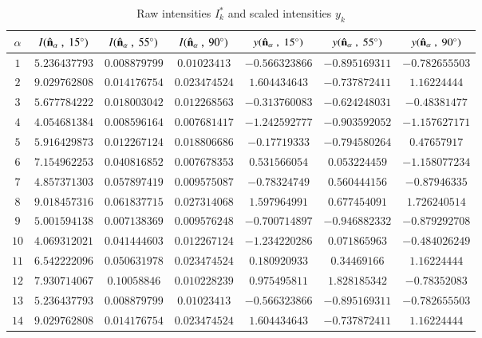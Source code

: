\documentclass[preprint,  3p]{elsarticle}
\begin{document}
\begin{table}[h]
	\begin{center}
		\caption{\label{tab:A2}
			Raw intensities $I_k^*$ and scaled intensities $y_k$}
		\begin{tabular}{|c|c|c|c|c|c|c|}
			\hline\hline
			$\alpha$  & $I(\hat{\bf n}_\alpha\ ,\ 15^{\circ})$ &  $I(\hat{\bf n}_\alpha \ , \ 55^{\circ})$ &  $I(\hat{\bf n}_\alpha \ ,\ 90^{\circ})$ & $y(\hat{\bf n}_\alpha \ , \ 15^{\circ})$ & $y(\hat{\bf n}_\alpha \ , \ 55^{\circ})$ & $y(\hat{\bf n}_\alpha \ , \ 90^{\circ})$ \\
			\hline
			$1$ & $5.236437793$ & $0.008879799$ & $0.01023413$ & $-0.566323866$ & $-0.895169311$ & $-0.782655503$ \\
			$2$ & $9.029762808$ & $0.014176754$ & $0.023474524$ & $1.604434643$ & $-0.737872411$ & $1.16224444$ \\
			$3$ & $5.677784222$ & $0.018003042$ & $0.012268563$ & $-0.313760083$ & $-0.624248031$ & $-0.48381477$ \\
			$4$ & $4.054681384$ & $0.008596164$ & $0.007681417$ & $-1.242592777$ & $-0.903592052$ & $-1.157627171$ \\
			$5$ & $5.916429873$ & $0.012267124$ & $0.018806686$ & $-0.17719333$ & $-0.794580264$ & $0.47657917$ \\
			$6$ & $7.154962253$ & $0.040816852$ & $0.007678353$ & $0.531566054$ & $0.053224459$ & $-1.158077234$ \\
			$7$ & $4.857371303$ & $0.057897419$ & $0.009575087$ & $-0.78324749$ & $0.560444156$ & $-0.87946335$ \\
			$8$ & $9.018457316$ & $0.061837715$ & $0.027314068$ & $1.597964991$ & $0.677454091$ & $1.726240514$ \\
			$9$ & $5.001594138$ & $0.007138369$ & $0.009576248$ & $-0.700714897$ & $-0.946882332$ & $-0.879292708$ \\
			$10$ & $4.069312021$ & $0.041444603$ & $0.012267124$ & $-1.234220286$ & $0.071865963$ & $-0.484026249$ \\
			$11$ & $6.542222096$ & $0.050631978$ & $0.023474524$ & $0.180920933$ & $0.34469166$ & $1.16224444$ \\
			$12$ & $7.930714067$ & $0.10058846$ & $0.010228239$ & $0.975495811$ & $1.828185342$ & $-0.78352083$ \\
			$13$ & $5.236437793$ & $0.008879799$ & $0.01023413$ & $-0.566323866$ & $-0.895169311$ & $-0.782655503$ \\
			$14$ & $9.029762808$ & $0.014176754$ & $0.023474524$ & $1.604434643$ & $-0.737872411$ & $1.16224444$ \\

\end{tabular}
\end{center}
\end{table}
\end{document}
